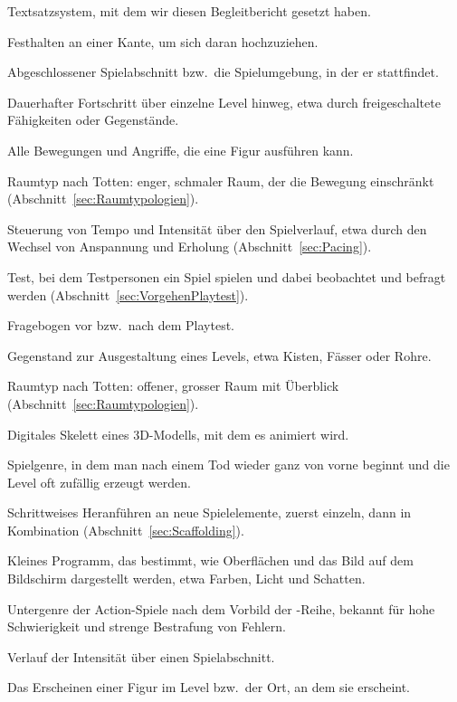\documentclass[../Main.tex]{subfiles}
\begin{document}
\begin{description}[style=unboxed, leftmargin=0cm, itemsep=0.3em]
\item[LaTeX] Textsatzsystem, mit dem wir diesen Begleitbericht gesetzt haben.
\item[Ledge Grab] Festhalten an einer Kante, um sich daran hochzuziehen.
\item[Level] Abgeschlossener Spielabschnitt bzw.\ die Spielumgebung, in der er stattfindet.
\item[Metaprogression] Dauerhafter Fortschritt über einzelne Level hinweg, etwa durch freigeschaltete Fähigkeiten oder Gegenstände.
\item[Moveset] Alle Bewegungen und Angriffe, die eine Figur ausführen kann.
\item[Narrow Space] Raumtyp nach Totten: enger, schmaler Raum, der die Bewegung einschränkt (Abschnitt~\ref{sec:Raumtypologien}).
\item[Pacing] Steuerung von Tempo und Intensität über den Spielverlauf, etwa durch den Wechsel von Anspannung und Erholung (Abschnitt~\ref{sec:Pacing}).
\item[Playtest] Test, bei dem Testpersonen ein Spiel spielen und dabei beobachtet und befragt werden (Abschnitt~\ref{sec:VorgehenPlaytest}).
\item[Pre-/Post-Questionnaire] Fragebogen vor bzw.\ nach dem Playtest.
\item[Prop] Gegenstand zur Ausgestaltung eines Levels, etwa Kisten, Fässer oder Rohre.
\item[Prospect Space] Raumtyp nach Totten: offener, grosser Raum mit Überblick (Abschnitt~\ref{sec:Raumtypologien}).
\item[Rig] Digitales Skelett eines 3D-Modells, mit dem es animiert wird.
\item[Roguelike] Spielgenre, in dem man nach einem Tod wieder ganz von vorne beginnt und die Level oft zufällig erzeugt werden.
\item[Scaffolding] Schrittweises Heranführen an neue Spielelemente, zuerst einzeln, dann in Kombination (Abschnitt~\ref{sec:Scaffolding}).
\item[Shader] Kleines Programm, das bestimmt, wie Oberflächen und das Bild auf dem Bildschirm dargestellt werden, etwa Farben, Licht und Schatten.
\item[Souls-like] Untergenre der Action-Spiele nach dem Vorbild der -Reihe, bekannt für hohe Schwierigkeit und strenge Bestrafung von Fehlern.
\item[Spannungskurve] Verlauf der Intensität über einen Spielabschnitt.
\item[Spawn, Spawnpunkt] Das Erscheinen einer Figur im Level bzw.\ der Ort, an dem sie erscheint.

\end{description}
\end{document}
